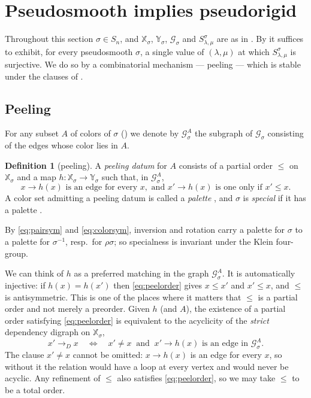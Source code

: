 \documentclass[12pt]{article}
\def\xspace{ }%
\theoremstyle{definition}
\newtheorem{definition}[definition]{Definition}
\newcommand{\prig}{pseudorigid\xspace}
\newcommand{\psm}{pseudosmooth\xspace}
\newcommand{\Psm}{Pseudosmooth\xspace}
\newcommand{\spc}{special\xspace}
\newcommand{\spcness}{specialness\xspace}
\newcommand{\pal}{palette\xspace}      %
\newcommand{\pset}{A}                  %
\newcommand{\XX}{\mathbb{X}}  %
\newcommand{\YY}{\mathbb{Y}}  %
\newcommand{\Sop}{S}
\newcommand{\wo}{w_0}                 %
\newcommand{\rc}{\rho}                %
\newcommand{\Gc}{\mathcal{G}}          %
\begin{document}
\section{\Psm implies \prig}\label{sec:forward}

Throughout this section $\sigma \in S_n$, and $\XX_\sigma$, $\YY_\sigma$,
$\Gc_\sigma$ and $\Sop^\sigma_{\lambda,\mu}$ are as in
. By  it suffices to exhibit, for
every \psm $\sigma$, a single value of $(\lambda,\mu)$ at which
$\Sop^\sigma_{\lambda,\mu}$ is surjective. We do so by
a combinatorial mechanism --- peeling --- which is stable under the
clauses of .

\subsection{Peeling}\label{ssec:peeling}

For any subset $\pset$ of colors of $\sigma$ () we denote by
$\Gc^\pset_\sigma$ the subgraph of $\Gc_\sigma$ consisting of the edges whose color lies in $\pset$. 

\begin{definition}[peeling]\label{def:peel}
A \emph{peeling datum} for $\pset$ consists of a partial order $\le$ on
$\XX_\sigma$ and a map $h : \XX_\sigma \to \YY_\sigma$ such that, in
$\Gc^\pset_\sigma$,
\begin{equation}\label{eq:peelorder}
   x \to h(x) \text{ is an edge for every } x, \text{ and }
   x' \to h(x) \text{ is one only if } x' \le x .
\end{equation}
A color set admitting a peeling datum is called a \emph{\pal}, and
$\sigma$ is \emph{\spc} if it has a \pal.
\end{definition}

By \eqref{eq:pairsym} and \eqref{eq:colorsym}, inversion and rotation carry
a \pal for $\sigma$ to a \pal for $\sigma^{-1}$, resp.\ for $\rc\sigma$;
so \spcness is invariant under the Klein four-group.

We can think of $h$ as a preferred matching in the graph $\Gc^\pset_\sigma$.
It is automatically injective: if $h(x) = h(x')$ then
\eqref{eq:peelorder} gives $x \le x'$ and $x' \le x$, and $\le$ is
antisymmetric. This is one of the places where it matters that $\le$ is a
partial order and not merely a preorder.
Given $h$ (and $\pset$), the existence of a partial order satisfying
\eqref{eq:peelorder} is equivalent to the acyclicity of the \emph{strict}
dependency digraph on $\XX_\sigma$,
\[
   x' \longrightarrow_D x
   \quad\Longleftrightarrow\quad
   x' \ne x \ \text{ and }\ x' \to h(x)\text{ is an edge in }\Gc^\pset_\sigma .
\]
The clause $x'\ne x$ cannot be omitted: $x \to h(x)$ is an edge for every
$x$, so without it the relation would have a loop at every vertex and
would never be acyclic.
Any refinement of $\le$ also satisfies \eqref{eq:peelorder}, so we may take
$\le$ to be a total order.
\end{document}
